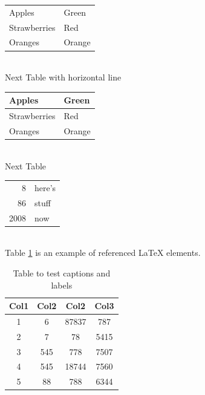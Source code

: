 \documentclass[a4paper, 12pt]{article}
\begin{document}
\begin{tabular}{|l|l|}
Apples & Green\\
Strawberries & Red \\
Oranges & Orange \\
\end{tabular} \\

Next Table with horizontal line\\

\begin{tabular}{|l|l|}
\hline
Apples & Green\\
\hline
Strawberries & Red \\
\hline
Oranges & Orange \\
\hline
\end{tabular} \\

Next Table \\

\begin{tabular}{|r|l|}
\hline
8 & here's \\
\cline{2-2}
86 & stuff \\
\hline \hline
2008 & now \\
\hline
\end{tabular} \\

Table \ref{table:data} is an example of referenced \LaTeX{} elements. \\

\begin{table}[h!]
\centering
\begin{tabular}{||c c c c||} 
 \hline
 Col1 & Col2 & Col2 & Col3 \\ [0.5ex] 
 \hline\hline
 1 & 6 & 87837 & 787 \\ 
 2 & 7 & 78 & 5415 \\
 3 & 545 & 778 & 7507 \\
 4 & 545 & 18744 & 7560 \\
 5 & 88 & 788 & 6344 \\ [1ex] 
 \hline
\end{tabular}
\caption{Table to test captions and labels}
\label{table:data}
\end{table}
\end{document}

